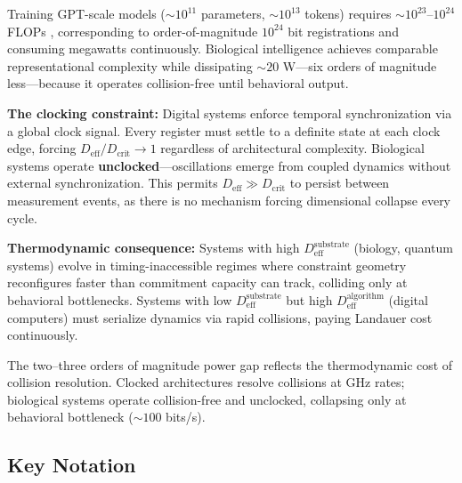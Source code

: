 \documentclass[12pt]{article}
\begin{document}
Training GPT-scale models ($\sim 10^{11}$ parameters, $\sim 10^{13}$ tokens) requires $\sim 10^{23}$--$10^{24}$ FLOPs \cite{kaplan2020}, corresponding to order-of-magnitude $10^{24}$ bit registrations and consuming megawatts continuously. Biological intelligence achieves comparable representational complexity while dissipating $\sim 20$ W---six orders of magnitude less---because it operates collision-free until behavioral output.

\textbf{The clocking constraint:} Digital systems enforce temporal synchronization via a global clock signal. Every register must settle to a definite state at each clock edge, forcing $D_{\text{eff}}/D_{\text{crit}} \to 1$ regardless of architectural complexity. Biological systems operate \textbf{unclocked}---oscillations emerge from coupled dynamics without external synchronization. This permits $D_{\text{eff}} \gg D_{\text{crit}}$ to persist between measurement events, as there is no mechanism forcing dimensional collapse every cycle.

\textbf{Thermodynamic consequence:} Systems with high $D_{\text{eff}}^{\text{substrate}}$ (biology, quantum systems) evolve in timing-inaccessible regimes where constraint geometry reconfigures faster than commitment capacity can track, colliding only at behavioral bottlenecks. Systems with low $D_{\text{eff}}^{\text{substrate}}$ but high $D_{\text{eff}}^{\text{algorithm}}$ (digital computers) must serialize dynamics via rapid collisions, paying Landauer cost continuously.

The two--three orders of magnitude power gap reflects the thermodynamic cost of collision resolution. Clocked architectures resolve collisions at GHz rates; biological systems operate collision-free and unclocked, collapsing only at behavioral bottleneck ($\sim 100$ bits/s).

\subsection{Key Notation}
\end{document}
